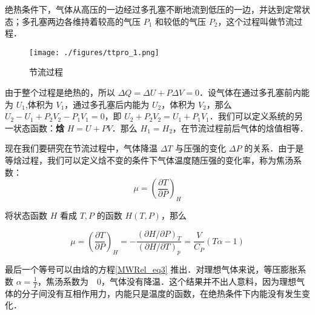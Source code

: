 

绝热条件下，气体从高压的一边经过多孔塞不断地流到低压的一边，并达到定常状态；多孔塞两边各维持着较高的气压 $P_1$ 和较低的气压 $P_2$，这个过程叫做节流过程．

\begin{figure}[ht]
\centering
\texttt{[image: ./figures/ttpro\_1.png]}
\caption{节流过程} \label{ttpro_fig1}
\end{figure}

由于整个过程是绝热的，所以 $\Delta Q=\Delta U+P\Delta V=0$．设气体在通过多孔塞前内能为 $U_1$,体积为 $V_1$，通过多孔塞后内能为 $U_2$，体积为 $V_2$，那么 $U_2-U_1+P_2V_2-P_1V_1=0$，即 $U_2+P_2V_2=U_1+P_1V_1$．我们可以定义系统的另一状态函数：\textbf{焓} $H=U+PV$．那么 $H_1=H_2$，在节流过程前后气体的焓值相等．

现在我们要研究在节流过程中，气体降温 $\Delta T$ 与压强的变化 $\Delta P$ 的关系．由于是等焓过程，我们可以定义焓不变的条件下气体温度随压强的变化率，称为焦汤系数：
\begin{equation}
\mu=\left(\frac{\partial T}{\partial P}\right)_H
\end{equation}

将状态函数 $H$ 看成 $T,P$ 的函数 $H(T,P)$，那么

\begin{equation}
\mu=\left(\frac{\partial T}{\partial P}\right)_H=
-\frac{(\partial H/\partial P)_T}{(\partial H/\partial T)_p}
=\frac{V}{C_P}(T\alpha-1)
\end{equation}

最后一个等号可以由焓的方程\autoref{MWRel_eq3} 推出．对理想气体来说，等压膨胀系数 $\alpha=\frac{1}{T}$，焦汤系数为　$0$，气体没有降温．这个结果并不出人意料，因为理想气体的分子间没有互相作用力，内能只是温度的函数，在绝热条件下内能没有发生变化．